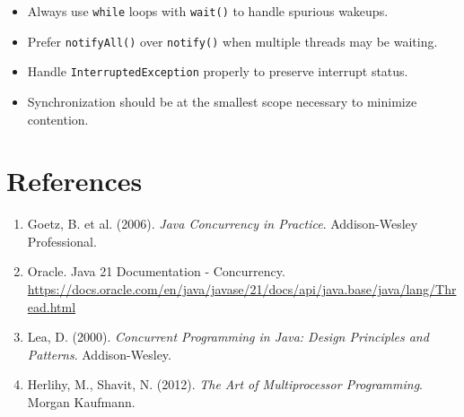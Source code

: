 \documentclass[10pt,a4paper,twocolumn]{article}
\begin{document}
\begin{itemize}
    \item Always use \texttt{while} loops with \texttt{wait()} to handle spurious wakeups.
    \item Prefer \texttt{notifyAll()} over \texttt{notify()} when multiple threads may be waiting.
    \item Handle \texttt{InterruptedException} properly to preserve interrupt status.
    \item Synchronization should be at the smallest scope necessary to minimize contention.
\end{itemize}

\section{References}

\begin{enumerate}
    \item Goetz, B. et al. (2006). \textit{Java Concurrency in Practice}. Addison-Wesley Professional.
    
    \item Oracle. Java 21 Documentation - Concurrency. \url{https://docs.oracle.com/en/java/javase/21/docs/api/java.base/java/lang/Thread.html}
    
    \item Lea, D. (2000). \textit{Concurrent Programming in Java: Design Principles and Patterns}. Addison-Wesley.
    
    \item Herlihy, M., Shavit, N. (2012). \textit{The Art of Multiprocessor Programming}. Morgan Kaufmann.
\end{enumerate}
\end{document}
